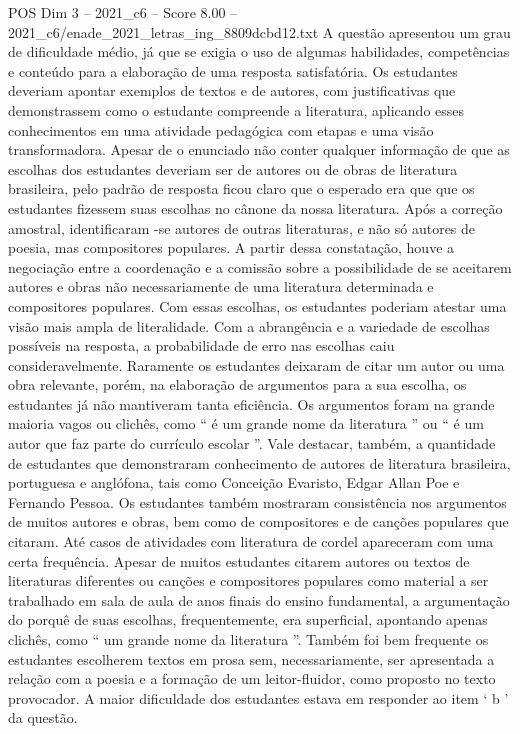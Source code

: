 \begin{textsample}{POS Dim 3 – 2021\_c6 – Score 8.00 – 2021\_c6/enade\_2021\_letras\_ing\_8809dcbd12.txt}
A questão apresentou um grau de dificuldade médio, já que se exigia o uso de algumas habilidades, competências e conteúdo para a elaboração de uma resposta satisfatória.
Os estudantes deveriam apontar exemplos de textos e de autores, com justificativas que demonstrassem como o estudante compreende a literatura, aplicando esses conhecimentos em uma atividade pedagógica com etapas e uma visão transformadora.
Apesar de o enunciado não conter qualquer informação de que as escolhas dos estudantes deveriam ser de autores ou de obras de literatura brasileira, pelo padrão de resposta ficou claro que o esperado era que que os estudantes fizessem suas escolhas no cânone da nossa literatura.
Após a correção amostral, identificaram -se autores de outras literaturas, e não só autores de poesia, mas compositores populares.
A partir dessa constatação, houve a negociação entre a coordenação e a comissão sobre a possibilidade de se aceitarem autores e obras não necessariamente de uma literatura determinada e compositores populares.
Com essas escolhas, os estudantes poderiam atestar uma visão mais ampla de literalidade.
Com a abrangência e a variedade de escolhas possíveis na resposta, a probabilidade de erro nas escolhas caiu consideravelmente.
Raramente os estudantes deixaram de citar um autor ou uma obra relevante, porém, na elaboração de argumentos para a sua escolha, os estudantes já não mantiveram tanta eficiência.
Os argumentos foram na grande maioria vagos ou clichês, como “ é um grande nome da literatura ” ou “ é um autor que faz parte do currículo escolar ”.
Vale destacar, também, a quantidade de estudantes que demonstraram conhecimento de autores de literatura brasileira, portuguesa e anglófona, tais como Conceição Evaristo, Edgar Allan Poe e Fernando Pessoa.
Os estudantes também mostraram consistência nos argumentos de muitos autores e obras, bem como de compositores e de canções populares que citaram.
Até casos de atividades com literatura de cordel apareceram com uma certa frequência.
Apesar de muitos estudantes citarem autores ou textos de literaturas diferentes ou canções e compositores populares como material a ser trabalhado em sala de aula de anos finais do ensino fundamental, a argumentação do porquê de suas escolhas, frequentemente, era superficial, apontando apenas clichês, como “ um grande nome da literatura ”.
Também foi bem frequente os estudantes escolherem textos em prosa sem, necessariamente, ser apresentada a relação com a poesia e a formação de um leitor-fluidor, como proposto no texto provocador.
A maior dificuldade dos estudantes estava em responder ao item ‘ b ’ da questão.

\end{textsample}
